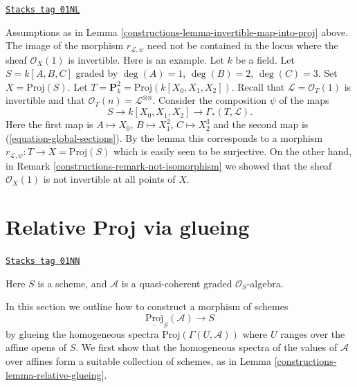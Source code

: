 \begin{remark}
\label{constructions-remark-not-in-invertible-locus}
\href{https://stacks.math.columbia.edu/tag/01NL}{\texttt{Stacks tag 01NL}}

Assumptions as in Lemma \ref{constructions-lemma-invertible-map-into-proj} above.
The image of the morphism $r_{\mathcal{L}, \psi}$ need not be
contained in the locus where the sheaf $\mathcal{O}_X(1)$
is invertible.
Here is an example.
Let $k$ be a field.
Let $S = k[A, B, C]$ graded by $\deg(A) = 1$, $\deg(B) = 2$, $\deg(C) = 3$.
Set $X = \text{Proj}(S)$.
Let $T = \mathbf{P}^2_k = \text{Proj}(k[X_0, X_1, X_2])$.
Recall that $\mathcal{L} = \mathcal{O}_T(1)$ is invertible
and that $\mathcal{O}_T(n) = \mathcal{L}^{\otimes n}$.
Consider the composition $\psi$ of the maps
$$
S \to k[X_0, X_1, X_2] \to \Gamma_*(T, \mathcal{L}).
$$
Here the first map is $A \mapsto X_0$, $B \mapsto X_1^2$,
$C \mapsto X_2^3$ and the second map is (\ref{equation-global-sections}).
By the lemma this corresponds to a morphism
$r_{\mathcal{L}, \psi} : T \to X = \text{Proj}(S)$
which is easily seen to be surjective. On the other hand, in
Remark \ref{constructions-remark-not-isomorphism} we showed that the sheaf
$\mathcal{O}_X(1)$ is not invertible at all points of $X$.
\end{remark}

\section{Relative Proj via glueing}
\label{constructions-section-relative-proj-via-glueing}
\begin{definition}
\label{constructions-situation-relative-proj}
\href{https://stacks.math.columbia.edu/tag/01NN}{\texttt{Stacks tag 01NN}}

Here $S$ is a scheme, and $\mathcal{A}$
is a quasi-coherent graded $\mathcal{O}_S$-algebra.
\end{definition}

In this section we outline how to construct a morphism
of schemes
$$
\underline{\text{Proj}}_S(\mathcal{A}) \longrightarrow S
$$
by glueing the homogeneous spectra $\text{Proj}(\Gamma(U, \mathcal{A}))$
where $U$ ranges over the affine opens of $S$. We first show that the
homogeneous spectra of the values of $\mathcal{A}$ over affines form a
suitable collection of schemes, as in Lemma \ref{constructions-lemma-relative-glueing}.

